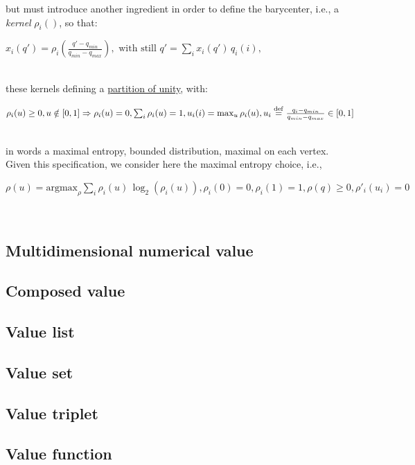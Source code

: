 \documentclass[a4,12pt]{article}
\newcommand{\deq}{\stackrel {\rm def}{=}}
\newcommand{\eqline}[1]{\\\centerline{$#1$}\\}
\begin{document}
but must introduce another ingredient in order to define the barycenter, i.e., a {\em kernel} $\rho_i()$, so that:
\eqline{x_i(q') = \rho_i\left(\frac{q' - q_{min}}{q_{min} - q_{max}}\right), \mbox{ with still } q' = \sum_i x_i(q') \, q_i(i),}
these kernels defining a \href{https://en.wikipedia.org/wiki/Partition_of_unity}{partition of unity}, with:
\eqline{\rho_i(u) \geq 0, u \notin [0, 1] \Rightarrow \rho_i(u) = 0, \sum_i \rho_i(u) = 1, u_i(i) = \max_u \rho_i(u), u_i \deq \frac{q_i - q_{min}}{q_{min} - q_{max}} \in [0, 1]}
in words a maximal entropy, bounded distribution, maximal on each vertex. Given this specification, we consider here the maximal entropy choice, i.e., 
\eqline{\rho(u) = \mbox{argmax}_\rho \sum_i \rho_i(u) \, \log_2(\rho_i(u)), \rho_i(0) = 0, \rho_i(1) = 1, \rho(q) \geq 0, \rho'_i(u_i) = 0}





\subsection*{Multidimensional numerical value} 

\subsection*{Composed value} 

\subsection*{Value list} 

\subsection*{Value set} 

\subsection*{Value triplet} 

\subsection*{Value function} 

\fi

{\scriptsize  }

\end{document}
